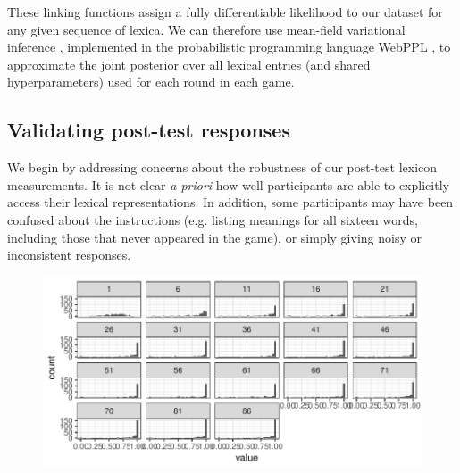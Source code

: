 \documentclass[10pt,letterpaper]{article}
\begin{document}
These linking functions assign a fully differentiable likelihood to our dataset for any given sequence of lexica. We can therefore use mean-field variational inference \cite{RanganathGerrishBlei13_BlackBoxVariationalInference}, implemented in the probabilistic programming language WebPPL \cite{GoodmanStuhlmuller14_DIPPL}, to approximate the joint posterior over all lexical entries (and shared hyperparameters) used for each round in each game. 

\subsection{Validating post-test responses}

We begin by addressing concerns about the robustness of our post-test lexicon measurements. It is not clear \emph{a priori} how well participants are able to explicitly access their lexical representations. In addition, some participants may have been confused about the instructions (e.g. listing meanings for all sixteen words, including those that never appeared in the game), or simply giving noisy or inconsistent responses. 



\begin{figure}[t]
\begin{center}
{\includegraphics[scale=.55]{wordFormationExample.pdf}}
{\caption{{\footnotesize {}  \label{fig:modelSchematic}}}}
\end{center}
\end{figure}
\end{document}

